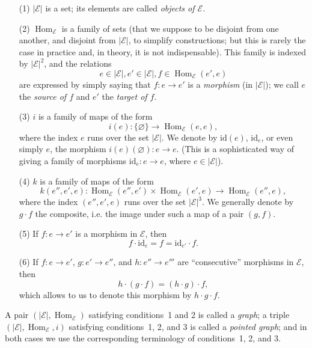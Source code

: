 \documentclass[fleqn]{article}
\newcommand{\oldpage}[1]{\marginpar{\footnotesize$\Big\vert$ \textit{p.~#1}}}
\newcommand{\id}{\mathrm{id}}
\newcommand{\cat}[1]{\mathcal{#1}}
\newcommand{\set}[1]{|#1|}
\DeclareMathOperator{\Hom}{Hom}
\begin{document}
\begin{enumerate}
  \item[(1)] $\set{\cat{E}}$ is a set; its elements are called \emph{objects of $\cat{E}$}.

  \item[(2)] $\Hom_\cat{E}$ is a family of sets (that we suppose to be disjoint from one another, and disjoint from $\set{\cat{E}}$, to simplify constructions; but this is rarely the case in practice and, in theory, it is not indispensable).
    This family is indexed by $\set{\cat{E}}^2$, and the relations
    \[
      e\in\set{\cat{E}},
      e'\in\set{\cat{E}},
      f\in\Hom_\cat{E}(e',e)
    \]
    are expressed by simply saying that $f\colon e\to e'$ is a \emph{morphism} (in $\set{\cat{E}}$);
    we call $e$ the \emph{source of $f$} and $e'$ the \emph{target of $f$}.

  \item[(3)] $i$ is a family of maps of the form
    \[
      i(e)\colon \{\varnothing\}
      \to \Hom_\cat{E}(e,e),
    \]
    where the index $e$ runs over the set $\set{\cat{E}}$.
    We denote by $\id(e)$, $\id_e$, or even simply $e$, the morphism $i(e)(\varnothing)\colon e\to e$.
    \oldpage{220}
    (This is a sophisticated way of giving a family of morphisms $\id_e\colon e\to e$, where $e\in\set{\cat{E}}$).

  \item[(4)] $k$ is a family of maps of the form
    \[
      k(e'',e',e)\colon
      \Hom_\cat{E}(e'',e')\times\Hom_\cat{E}(e',e)
      \to \Hom_\cat{E}(e'',e),
    \]
    where the index $(e'',e',e)$ runs over the set $\set{\cat{E}}^3$.
    We generally denote by $g\cdot f$ the composite, i.e. the image under such a map of a pair $(g,f)$.

  \item[(5)] If $f\colon e\to e'$ is a morphism in $\cat{E}$, then
    \[
      f\cdot\id_e
      = f
      = \id_{e'}\cdot f.
    \]

  \item[(6)] If $f\colon e\to e'$, $g\colon e'\to e''$, and $h\colon e''\to e'''$ are ``consecutive'' morphisms in $\cat{E}$, then
    \[
      h\cdot(g\cdot f)
      = (h\cdot g)\cdot f,
    \]
    which allows to us to denote this morphism by $h\cdot g\cdot f$.
\end{enumerate}

A pair $(\set{\cat{E}},\Hom_\cat{E})$ satisfying conditions~1 and 2 is called a \emph{graph}; a triple $(\set{\cat{E}},\Hom_\cat{E},i)$ satisfying conditions~1, 2, and 3 is called a \emph{pointed graph}; and in both cases we use the corresponding terminology of conditions~1, 2, and 3.
\end{document}
